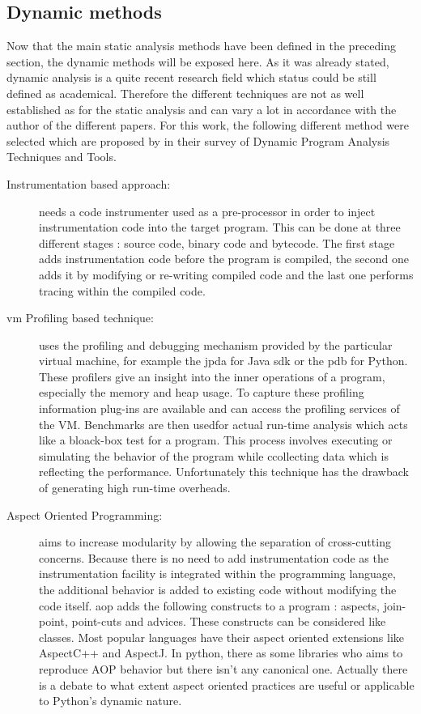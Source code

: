 \subsection{Dynamic methods}

Now that the main static analysis methods have been defined in the preceding section, the dynamic methods will be exposed here. As it was already stated, dynamic analysis is a quite recent research field which status could be still defined as academical. Therefore the different techniques are not as well established as for the static analysis and can vary a lot in accordance with the author of the different papers. For this work, the following different method were selected which are proposed by \cite{Gosain2015} in their survey of Dynamic Program Analysis Techniques and Tools. 

\begin{description}
  \item[Instrumentation based approach:] needs a code instrumenter used as a pre-processor in order to inject instrumentation code into the target program. This can be done at three different stages : source code, binary code and bytecode. The first stage adds instrumentation code before the program is compiled, the second one adds it by modifying or re-writing compiled code and the last one performs tracing within the compiled code.
  
  \item[\gls{vm} Profiling based technique:] uses the profiling and debugging mechanism provided by the particular virtual machine, for example the \gls{jpda} for Java \gls{sdk} or the \gls{pdb} for Python. These profilers give an insight into the inner operations of a program, especially the memory and heap usage. To capture these profiling information plug-ins are available and can access the profiling services of the VM. Benchmarks are then usedfor actual run-time analysis which acts like a bloack-box test for a program. This process involves executing or simulating the behavior of the program while ccollecting data which is reflecting the performance. Unfortunately this technique has the drawback of generating high run-time overheads. 
  
  \item[Aspect Oriented Programming:] aims to increase modularity by allowing the separation of cross-cutting concerns. Because there is no need to add instrumentation code as the instrumentation facility is integrated within the programming language, the additional behavior is added to existing code without modifying the code itself. \gls{aop} adds the following constructs to a program : aspects, join-point, point-cuts and advices. These constructs can be considered like classes. Most popular languages have their aspect oriented extensions like AspectC++ and AspectJ. In python, there as some libraries who aims to reproduce AOP behavior but there isn't any canonical one. Actually there is a debate to what extent aspect oriented practices are useful or applicable to Python's dynamic nature. 
  
\end{description}


